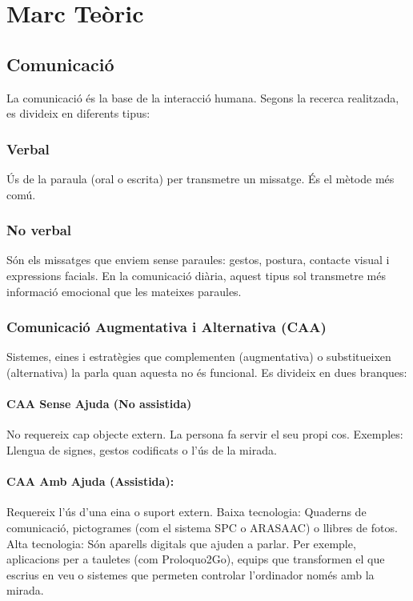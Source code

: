 \chapter{Marc Teòric}

\section{Comunicació}
La comunicació és la base de la interacció humana. Segons la recerca realitzada, es divideix en diferents tipus:

\subsection{Verbal} 
Ús de la paraula (oral o escrita) per transmetre un missatge. És el mètode més comú.

\subsection{No verbal}
Són els missatges que enviem sense paraules: gestos, postura, contacte visual i expressions facials. En la comunicació diària, aquest tipus sol transmetre més informació emocional que les mateixes paraules.

\subsection{Comunicació Augmentativa i Alternativa (CAA)}
Sistemes, eines i estratègies que complementen (augmentativa) o substitueixen (alternativa) la parla quan aquesta no és funcional. Es divideix en dues branques:

\subsubsection{CAA Sense Ajuda (No assistida)}
No requereix cap objecte extern. La persona fa servir el seu propi cos.
{Exemples:} Llengua de signes, gestos codificats o l'ús de la mirada.

\subsubsection{CAA Amb Ajuda (Assistida):} Requereix l'ús d'una eina o suport extern.
{Baixa tecnologia:} Quaderns de comunicació, pictogrames (com el sistema SPC o ARASAAC) o llibres de fotos.
{Alta tecnologia:} Són aparells digitals que ajuden a parlar. Per exemple, aplicacions per a tauletes (com Proloquo2Go), equips que transformen el que escrius en veu o sistemes que permeten controlar l'ordinador només amb la mirada.



